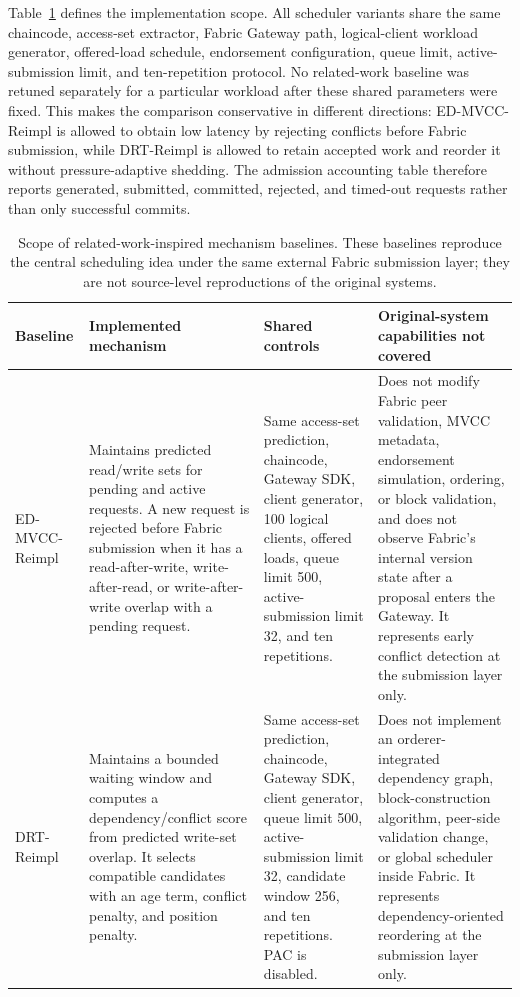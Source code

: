 \documentclass[fleqn,10pt,lineno]{wlpeerj}
\begin{document}
Table~\ref{tab:baseline-scope} defines the implementation scope. All scheduler variants share the same chaincode, access-set extractor, Fabric Gateway path, logical-client workload generator, offered-load schedule, endorsement configuration, queue limit, active-submission limit, and ten-repetition protocol. No related-work baseline was retuned separately for a particular workload after these shared parameters were fixed. This makes the comparison conservative in different directions: ED-MVCC-Reimpl is allowed to obtain low latency by rejecting conflicts before Fabric submission, while DRT-Reimpl is allowed to retain accepted work and reorder it without pressure-adaptive shedding. The admission accounting table therefore reports generated, submitted, committed, rejected, and timed-out requests rather than only successful commits.

\begin{table}[ht]
\centering
\small
\caption{Scope of related-work-inspired mechanism baselines. These baselines reproduce the central scheduling idea under the same external Fabric submission layer; they are not source-level reproductions of the original systems.}
\label{tab:baseline-scope}
\begin{tabularx}{\textwidth}{@{}p{}p{}p{}X@{}}
\toprule
Baseline & Implemented mechanism & Shared controls & Original-system capabilities not covered \\
\midrule
ED-MVCC-Reimpl & Maintains predicted read/write sets for pending and active requests. A new request is rejected before Fabric submission when it has a read-after-write, write-after-read, or write-after-write overlap with a pending request. & Same access-set prediction, chaincode, Gateway SDK, client generator, 100 logical clients, offered loads, queue limit 500, active-submission limit 32, and ten repetitions. & Does not modify Fabric peer validation, MVCC metadata, endorsement simulation, ordering, or block validation, and does not observe Fabric's internal version state after a proposal enters the Gateway. It represents early conflict detection at the submission layer only. \\
DRT-Reimpl & Maintains a bounded waiting window and computes a dependency/conflict score from predicted write-set overlap. It selects compatible candidates with an age term, conflict penalty, and position penalty. & Same access-set prediction, chaincode, Gateway SDK, client generator, queue limit 500, active-submission limit 32, candidate window 256, and ten repetitions. PAC is disabled. & Does not implement an orderer-integrated dependency graph, block-construction algorithm, peer-side validation change, or global scheduler inside Fabric. It represents dependency-oriented reordering at the submission layer only. \\
\bottomrule
\end{tabularx}
\end{table}
\end{document}
